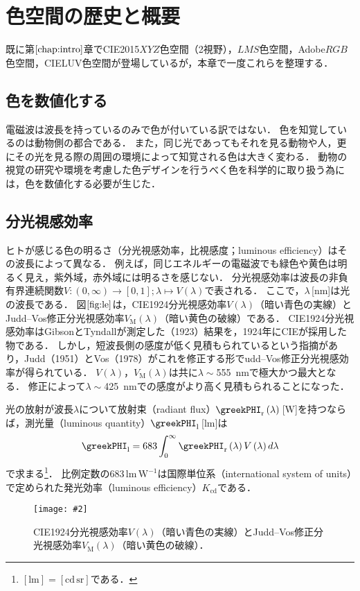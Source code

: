 \documentclass[uplatex,paper=a4,fontsize=4.0truemm,jafontsize=4.0truemm,head_space=30.0truemm,foot_space=30.0truemm,baselineskip=8.0truemm,line_length=40zw,gutter=25.0truemm,oneside,openany,fleqn,hanging_panctuation,open_bracket_pos=nibu_tentsuki,dvipdfmx,jis2004,book,titlepage]{jlreq}
\theoremstyle{mystyle}
\newcommand{\captiondot}[1]{\caption{#1．}}
\newcommand{\figureinput}[4]{\begin{figure}[btp]\centering\texttt{[image: \#2]}\captiondot{#3}\label{fig:#4}\end{figure}}
\newcommand{\mathdisplaystyle}[1]{\(\displaystyle{#1}\)}
\newcommand{\Reference}[1]{\mathdisplaystyle{\ref{#1}}}
\newcommand{\negativevalue}[1]{{-#1}}
\newcommand{\parentheses}[1]{\left(#1\right)}
\newcommand{\squarebrackets}[1]{\left[#1\right]}
\begin{document}
	\chapter{色空間の歴史と概要}
		既に第\Reference{chap:intro}章でCIE2015\mathdisplaystyle{XYZ}色空間（2\textdegree 視野），\mathdisplaystyle{LMS}色空間，Adobe\mathdisplaystyle{RGB}色空間，CIELUV色空間が登場しているが，本章で一度これらを整理する．
		\section{色を数値化する}
			電磁波は波長を持っているのみで色が付いている訳ではない．
			色を知覚しているのは動物側の都合である．
			また，同じ光であってもそれを見る動物や人，更にその光を見る際の周囲の環境によって知覚される色は大きく変わる．
			動物の視覚の研究や環境を考慮した色デザインを行うべく色を科学的に取り扱う為には，色を数値化する必要が生じた．
		\section{分光視感効率}
			ヒトが感じる色の明るさ（分光視感効率，比視感度；luminous efficiency）はその波長によって異なる．
			例えば，同じエネルギーの電磁波でも緑色や黄色は明るく見え，紫外域，赤外域には明るさを感じない．
			分光視感効率は波長の非負有界連続関数\mathdisplaystyle{V\colon\parentheses{0,\infty}\to\squarebrackets{0,1};\lambda\mapsto V\parentheses{\lambda}}で表される．
			ここで，\mathdisplaystyle{\lambda}\,[nm]は光の波長である．
			図\Reference{fig:le}は，CIE1924分光視感効率\mathdisplaystyle{V\parentheses{\lambda}}（暗い青色の実線）とJudd--Vos修正分光視感効率\mathdisplaystyle{V_\textrm{M}\parentheses{\lambda}}\cite{Vos1978}（暗い黄色の破線）である．
			CIE1924分光視感効率はGibsonとTyndallが測定した（1923）結果を，1924年にCIEが採用した物である．
			しかし，短波長側の感度が低く見積もられているという指摘があり，Judd（1951）とVos（1978）がこれを修正する形でudd--Vos修正分光視感効率が得られている．
			\mathdisplaystyle{V\parentheses{\lambda}}，\mathdisplaystyle{V_\textrm{M}\parentheses{\lambda}}は共に\mathdisplaystyle{\lambda\sim{}}\SI{555}{nm}で極大かつ最大となる．
			修正によって\mathdisplaystyle{\lambda\sim{}}\SI{425}{nm}での感度がより高く見積もられることになった．

			光の放射が波長\mathdisplaystyle{\lambda}について放射束（radiant flux）\mathdisplaystyle{\greekPHI_\textrm{r}\parentheses{\lambda}}\,[W]を持つならば，測光量（luminous quantity）\mathdisplaystyle{\greekPHI_\textrm{l}}\,[lm]は
			\begin{equation*}
				\greekPHI_\textrm{l}=683\int_0^\infty{\greekPHI_\textrm{r}\parentheses{\lambda}V\parentheses{\lambda}}\,d\lambda
			\end{equation*}
			で求まる\footnote{\mathdisplaystyle{[\textrm{lm}]=[\textrm{cd}\,\textrm{sr}]}である．}．
			比例定数の683\,lm\,\mathdisplaystyle{\textrm{W}^{\negativevalue{1}}}は国際単位系（international system of units）で定められた発光効率（luminous efficiency）\mathdisplaystyle{K_\textrm{cd}}である．
			\figureinput{width=\linewidth}{D:/a/figs/le.png}{CIE1924分光視感効率\mathdisplaystyle{V\parentheses{\lambda}}（暗い青色の実線）とJudd--Vos修正分光視感効率\mathdisplaystyle{V_\textrm{M}\parentheses{\lambda}}（暗い黄色の破線）}{le}
\end{document}
